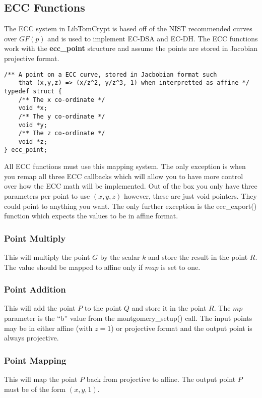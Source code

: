 \documentclass[a4paper]{book}
\begin{document}
\subsection{ECC Functions}
The ECC system in LibTomCrypt is based off of the NIST recommended curves over $GF(p)$ and is used to implement EC-DSA and EC-DH.   The ECC functions work with 
the \textbf{ecc\_point} structure and assume the points are stored in Jacobian projective format.

\begin{verbatim}
/** A point on a ECC curve, stored in Jacbobian format such 
    that (x,y,z) => (x/z^2, y/z^3, 1) when interpretted as affine */
typedef struct {
    /** The x co-ordinate */
    void *x;
    /** The y co-ordinate */
    void *y;
    /** The z co-ordinate */
    void *z;
} ecc_point;
\end{verbatim}

All ECC functions must use this mapping system.  The only exception is when you remap all three ECC callbacks which will allow you to have more control
over how the ECC math will be implemented.  Out of the box you only have three parameters per point to use $(x, y, z)$ however, these are just void pointers.  They
could point to anything you want.  The only further exception is the ecc\_export() function which expects the values to be in affine format.

\subsubsection{Point Multiply}
This will multiply the point $G$ by the scalar $k$ and store the result in the point $R$.  The value should be mapped to affine only if $map$ is set to one.  

\subsubsection{Point Addition}
This will add the point $P$ to the point $Q$ and store it in the point $R$.  The $mp$ parameter is the ``b'' value from the montgomery\_setup() call.  The input points
may be in either affine (with $z = 1$) or projective format and the output point is always projective.  

\subsubsection{Point Mapping}
This will map the point $P$ back from projective to affine.  The output point $P$ must be of the form $(x, y, 1)$.  
\end{document}
